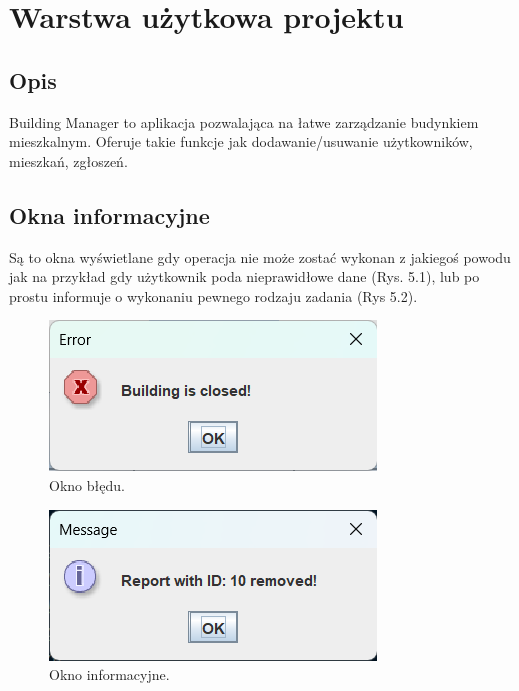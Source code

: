 \newpage
\chapter{Warstwa użytkowa projektu}
\section{Opis}
Building Manager to aplikacja pozwalająca na łatwe zarządzanie budynkiem mieszkalnym. Oferuje takie funkcje jak dodawanie/usuwanie użytkowników, 
mieszkań, zgłoszeń.

\section{Okna informacyjne}
Są to okna wyświetlane gdy operacja nie może zostać wykonan z jakiegoś powodu jak na przykład gdy użytkownik poda nieprawidłowe dane (Rys. 5.1), 
lub po prostu informuje o wykonaniu pewnego rodzaju zadania (Rys 5.2).

\begin{figure}[H]
    \centering
    \includegraphics[width=\textwidth,height=0.2\textheight,keepaspectratio]{figures/app-images/closed-building.png}
    \caption{Okno błędu. \label{fig6}}
\end{figure}

\begin{figure}[H]
    \centering
    \includegraphics[width=\textwidth,height=0.2\textheight,keepaspectratio]{figures/app-images/info.png}
    \caption{Okno informacyjne. \label{fig7}}
\end{figure}

